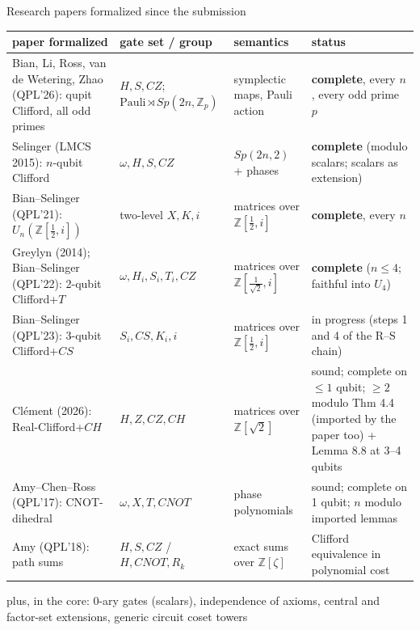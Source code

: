 \begin{frame}{Research papers formalized since the submission \New}
\centering\scriptsize
\renewcommand{\arraystretch}{1.18}
\begin{tabular}{@{}p{4.0cm}p{2.7cm}p{2.6cm}p{4.0cm}@{}}
\toprule
paper formalized & gate set / group & semantics & status\\
\midrule
Bian, Li, Ross, van de Wetering, Zhao (QPL'26): qupit Clifford, all odd primes
  & $H,S,CZ$; $\text{Pauli}\rtimes Sp(2n,\mathbb{Z}_p)$ & symplectic maps, Pauli action & \textbf{complete}, every $n$, every odd prime $p$\\
Selinger (LMCS 2015): $n$-qubit Clifford & $\omega,H,S,CZ$ & $Sp(2n,2)$ + phases & \textbf{complete} (modulo scalars; scalars as extension)\\
Bian--Selinger (QPL'21): $U_n(\mathbb{Z}[\frac12,i])$ & two-level $X,K,i$ & \alert{matrices} over $\mathbb{Z}[\frac12,i]$ & \textbf{complete}, every $n$\\
Greylyn (2014); Bian--Selinger (QPL'22): 2-qubit Clifford+$T$ & $\omega,H_i,S_i,T_i,CZ$ & \alert{matrices} over $\mathbb{Z}[\frac1{\sqrt2},i]$ & \textbf{complete} ($n\le4$; faithful into $U_4$)\\
Bian--Selinger (QPL'23): 3-qubit Clifford+$CS$ & $S_i, CS, K_i, i$ & matrices over $\mathbb{Z}[\frac12,i]$ & in progress (steps 1 and 4 of the R--S chain)\\
Clément (2026): Real-Clifford+$CH$ & $H,Z,CZ,CH$ & \alert{matrices} over $\mathbb{Z}[\sqrt2]$ & sound; complete on $\le1$ qubit; $\ge2$ modulo Thm 4.4 (imported by the paper too) + Lemma 8.8 at 3--4 qubits\\
Amy--Chen--Ross (QPL'17): CNOT-dihedral & $\omega,X,T,CNOT$ & phase polynomials & sound; complete on 1 qubit; $n$ modulo imported lemmas\\
Amy (QPL'18): path sums & $H,S,CZ$ / $H,CNOT,R_k$ & exact sums over $\mathbb{Z}[\zeta]$ & Clifford equivalence in \alert{polynomial cost}\\
\bottomrule
\end{tabular}

\vspace{4pt}
{\scriptsize plus, in the core: 0-ary gates (scalars), independence of axioms, central and
factor-set extensions, generic circuit coset towers}
\end{frame}

